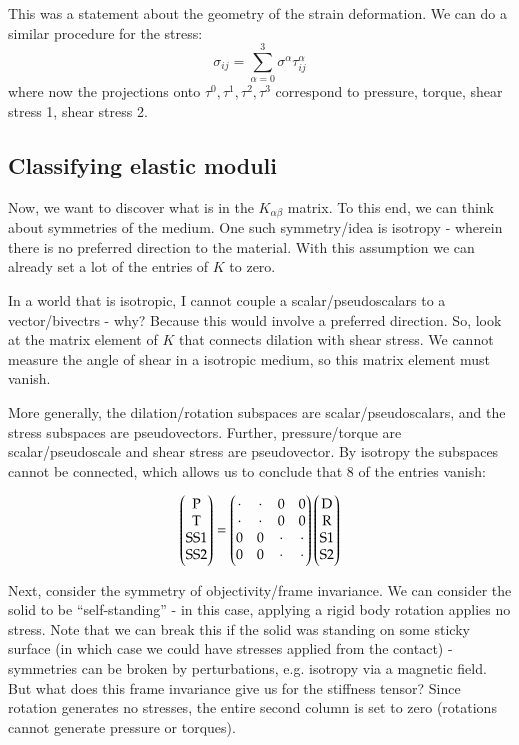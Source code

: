 This was a statement about the geometry of the strain deformation. We can do a similar procedure for the stress:
\begin{equation}
    \sigma_{ij} = \sum_{\alpha=0}^3 \sigma^\alpha \tau^\alpha_{ij}
\end{equation}
where now the projections onto $\tau^0, \tau^1, \tau^2, \tau^3$  correspond to pressure, torque, shear stress 1, shear stress 2.

\subsection{Classifying elastic moduli}
Now, we want to discover what is in the $K_{\alpha\beta}$ matrix. To this end, we can think about symmetries of the medium. One such symmetry/idea is isotropy - wherein there is no preferred direction to the material. With this assumption we can already set a lot of the entries of $K$ to zero. 

In a world that is isotropic, I cannot couple a scalar/pseudoscalars to a vector/bivectrs - why? Because this would involve a preferred direction. So, look at the matrix element of $K$ that connects dilation with shear stress. We cannot measure the angle of shear in a isotropic medium, so this matrix element must vanish.

More generally, the dilation/rotation subspaces are scalar/pseudoscalars, and the stress subspaces are pseudovectors. Further, pressure/torque are scalar/pseudoscale and shear stress are pseudovector. By isotropy the subspaces cannot be connected, which allows us to conclude that 8 of the entries vanish:

\begin{equation}
    \begin{pmatrix}\text{P} \\ \text{T} \\ \text{SS1} \\ \text{SS2}\end{pmatrix} = \begin{pmatrix}\cdot & \cdot & 0 & 0 \\ \cdot & \cdot & 0 & 0 \\ 0 & 0 & \cdot & \cdot \\ 0 & 0 & \cdot & \cdot\end{pmatrix}\begin{pmatrix}\text{D} \\ \text{R} \\ \text{S1} \\ \text{S2}\end{pmatrix}
\end{equation}

Next, consider the symmetry of objectivity/frame invariance. We can consider the solid to be ``self-standing'' - in this case, applying a rigid body rotation applies no stress. Note that we can break this if the solid was standing on some sticky surface (in which case we could have stresses applied from the contact) - symmetries can be broken by perturbations, e.g. isotropy via a magnetic field. But what does this frame invariance give us for the stiffness tensor? Since rotation generates no stresses, the entire second column is set to zero (rotations cannot generate pressure or torques).

